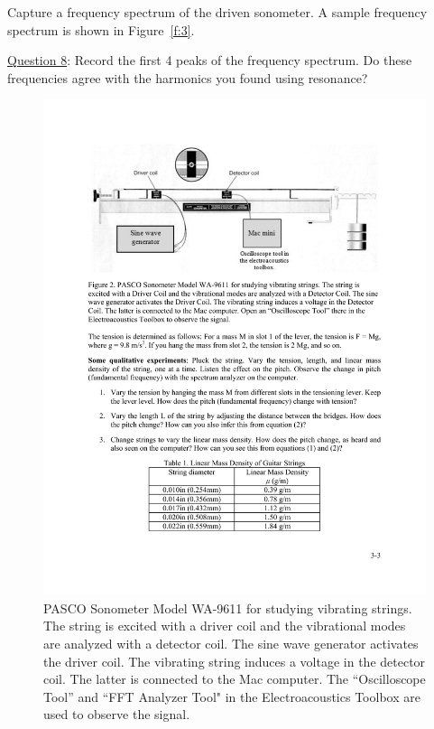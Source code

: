 \documentclass[11pt]{NSF}
\begin{document}
Capture a frequency spectrum of the driven sonometer.
A sample frequency spectrum is shown in Figure~\ref{f:3}.

\underline{Question 8}: Record the first 4 peaks of the frequency spectrum. Do these frequencies agree with the harmonics you found using resonance?
%
\begin{figure}[hbtp] 
\begin{center} 
\includegraphics[width=\textwidth]{fig3_2}
\caption{PASCO Sonometer Model WA-9611 for studying vibrating strings. The
string is excited with a driver coil and the vibrational modes are analyzed
with a detector coil. The sine wave generator activates the driver coil. The
vibrating string induces a voltage in the detector coil. The latter is
connected to the Mac computer. The ``Oscilloscope Tool” and ``FFT Analyzer
Tool" in the Electroacoustics Toolbox are used to observe the signal.}
\label{f:2} 
\end{center} 
\end{figure}
%
%
\end{document}
